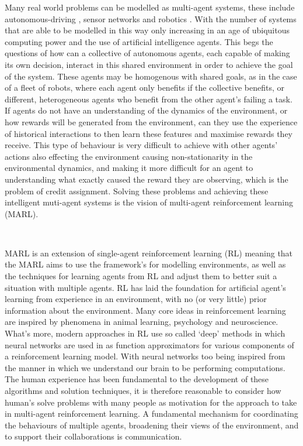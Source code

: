 \documentclass{article}
\begin{document}
Many real world problems can be modelled as multi-agent systems, these include autonomous-driving \citep{shavlev2016safe}, sensor networks \citep{vinyals2014sensor} and robotics \citep{kober2013reinforcement}. With the number of systems that are able to be modelled in this way only increasing in an age of ubiquitous computing power and the use of artificial intelligence agents. This begs the questions of how can a collective of autonomous agents, each capable of making its own decision, interact in this shared environment in order to achieve the goal of the system. These agents may be homogenous with shared goals, as in the case of a fleet of robots,  where each agent only benefits if the collective benefits, or different, heterogeneous agents who benefit from the other agent's failing a task. If agents do not have an understanding of the dynamics of the environment, or how rewards will be generated from the environment, can they use the experience of historical interactions to then learn these features and maximise rewards they receive. This type of behaviour is very difficult to achieve with other agents' actions also effecting the environment causing non-stationarity in the environmental dynamics, and making it more difficult for an agent to understanding what exactly caused the reward they are observing, which is the problem of credit assignment. Solving these problems and achieving these intelligent muti-agent systems is the vision of multi-agent reinforcement learning (MARL). \citep{albrecht2024marl}

\

MARL is an extension of single-agent reinforcement learning (RL) \citep{sutton2018reinforcement} meaning that the MARL aims to use the framework's for modelling environments, as well as the techniques for learning agents from RL and adjust them to better suit a situation with multiple agents. RL has laid the foundation for artificial agent's learning from experience in an environment, with no (or very little) prior information about the environment. Many core ideas in reinforcement learning are inspired by phenomena in animal learning, psychology and neuroscience. \citep{subramanian2020psychological} What's more, modern approaches in RL use so called `deep' methods \citep{wang2024deep} in which neural networks are used in as function approximators for various components of a reinforcement learning model. With neural networks too being inspired from the manner in which we understand our brain to be performing computations. The human experience has been fundamental to the development of these algorithms and solution techniques, it is therefore reasonable to consider how human's solve problems with many people as motivation for the approach to take in multi-agent reinforcement learning. A fundamental mechanism for coordinating the behaviours of multiple agents, broadening their views of the environment, and to support their collaborations is communication. \citep{zhu2024survey}
\end{document}
